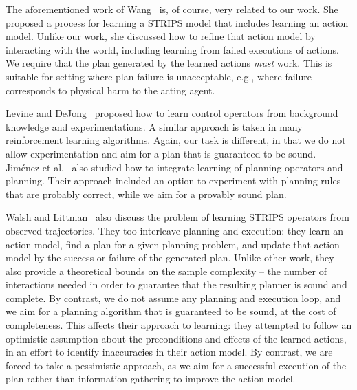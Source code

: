 \documentclass[letterpaper]{article}
\begin{document}


The aforementioned work of Wang~ is, of course, very related to our work. She proposed a process for learning a STRIPS model that includes learning an action model. Unlike our work, she discussed how to refine that action model by interacting with the world, including learning from failed executions of actions.  We require that the plan generated by the learned actions {\em must} work. This is suitable for setting where plan failure is unacceptable, e.g., where failure corresponds to physical harm to the acting agent.  


Levine and DeJong~ proposed how to learn control operators 
from background knowledge and experimentations. A similar approach is taken in many reinforcement learning algorithms. Again, our task is different, in that we do not allow experimentation and aim for a plan that is guaranteed to be sound. Jim{\'e}nez et al.~ also studied how to integrate learning of planning operators and planning. Their approach included an option to experiment with planning rules that are probably correct, while we aim for a provably sound plan. 

Walsh and Littman~ also discuss the problem of learning STRIPS operators from observed trajectories. They too interleave planning and execution: they learn an action model, find a plan for a given planning problem, and update that action model by the success or failure of the generated plan. Unlike other work, they also provide a theoretical bounds on the sample complexity -- the number of interactions needed in order to guarantee that the resulting planner is sound and complete. By contrast, we do not assume any planning and execution loop, and we aim for a planning algorithm that is guaranteed to be sound, at the cost of completeness. 
This affects their approach to learning: they attempted to follow an optimistic assumption about the preconditions and effects of the learned actions, in an effort to identify inaccuracies in their action model. By contrast, we are forced to take a pessimistic approach, as we aim for a successful execution of the plan rather than information gathering to improve the action model. 
\end{document}
